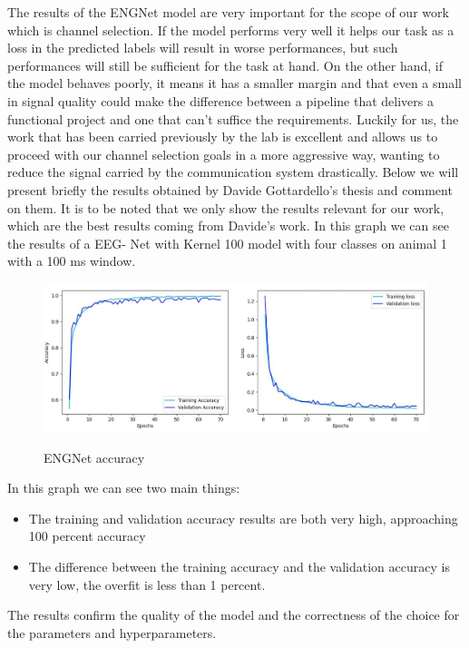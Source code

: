 \documentclass{Configuration_Files/PoliMi3i_thesis}
\begin{document}
The results of the ENGNet model are very important for the scope of our work which is channel selection.
If the model performs very well it helps our task as a loss in the predicted labels will result in worse performances, but such performances will still be sufficient for the task at hand.
On the other hand, if the model behaves poorly, it means it has a smaller margin and that even a small in signal quality could make the difference between a pipeline that delivers a functional project and one that can't suffice the requirements.
Luckily for us, the work that has been carried previously by the lab is excellent and allows us to proceed with our channel selection goals in a more aggressive way, wanting to reduce the signal carried by the communication system drastically.
Below we will present briefly the results obtained by Davide Gottardello's thesis and comment on them.
It is to be noted that we only show the results relevant for our work, which are the best results coming from Davide's work.
In this graph we can see the results of a EEG- Net with Kernel 100 model with four classes on animal 1 with a 100 ms window.
\begin{figure}[H]
	\includegraphics[scale=0.5]{trainingAccuracyDavide.png}
	\centering
    \label{engNet_params_4}

    \caption{ENGNet accuracy \cite{tesiDavide}}
	\end{figure}


In this graph we can see two main things:
\begin{itemize}
    \item The training and validation accuracy results are both very high, approaching 100 percent accuracy
    \item The difference between the training accuracy and the validation accuracy is very low, the overfit is less than 1 percent.
\end{itemize}

The results confirm the quality of the model and the correctness of the choice for the parameters and hyperparameters.
\end{document}
